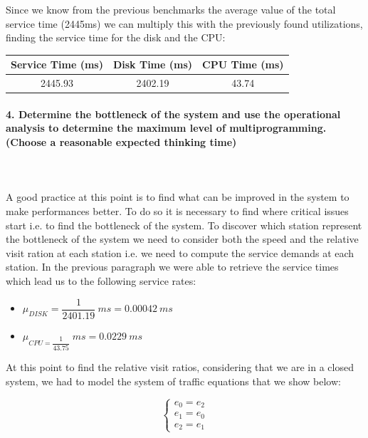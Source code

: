 \documentclass[11pt]{scrartcl} %
\begin{document}
Since we know from the previous benchmarks the average value of the total service time (2445ms) we can multiply this with the previously found utilizations, finding the service time for the disk and the CPU:

\begin{table}[H]
\centering
\begin{tabular}{c|c|c}
\multicolumn{1}{l|}{Service Time (ms)} & \multicolumn{1}{l|}{Disk Time (ms)} & \multicolumn{1}{l}{CPU Time (ms)} \\ \hline
2445.93	&  2402.19	& 43.74\\
\end{tabular}
\end{table}


\paragraph*{4. Determine the bottleneck of the system and use the operational analysis to determine the maximum level of multiprogramming. (Choose a reasonable expected thinking time)} \mbox{}\\\\

A good practice at this point is  to find what can be improved in the system to make performances better. To do so it is necessary to find where critical issues start i.e. to find the bottleneck of the system. To discover which station represent the bottleneck of the system we need to consider both the speed and the relative  visit ration at each station i.e. we need to compute the service demands at each station. In the previous paragraph we were able to retrieve the service times which lead us  to the following service rates:

\begin{itemize}
\item[] $\mu_{DISK}=\dfrac{1}{2401.19}\ ms=0.00042\ ms$
\item[] $\mu_{CPU=\dfrac{1}{43.75}}\ ms=0.0229\ ms$
\end{itemize}

At this point to find the relative visit ratios, considering that we are in a closed system, we had to model the system of traffic equations that we show below:

$$\begin{cases} e_0=e_2\\ e_1=e_0\\ e_2=e_1\end{cases}$$
\end{document}
